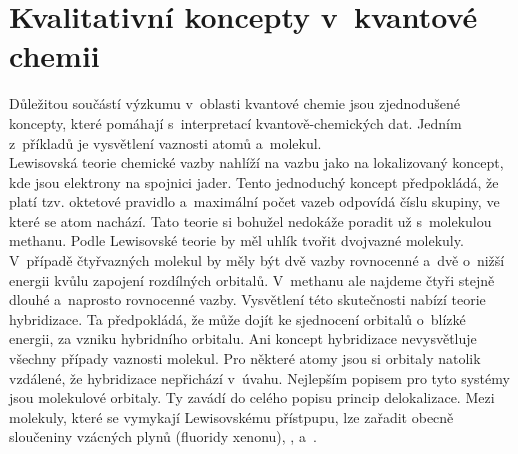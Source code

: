 \documentclass[
  printed, %
  table,   %
  lof,     %
  lot,     %
  oneside,
]{fithesis3}
\begin{document}
\section{Kvalitativní koncepty v~kvantové chemii}
Důležitou součástí výzkumu v~oblasti kvantové chemie jsou zjednodušené koncepty, které pomáhají s~interpretací kvantově-chemických dat. Jedním z~příkladů je vysvětlení vaznosti atomů a~molekul. \\
Lewisovská teorie chemické vazby nahlíží na vazbu jako na lokalizovaný koncept, kde jsou elektrony na spojnici jader. Tento jednoduchý koncept předpokládá, že platí tzv. oktetové pravidlo a~maximální počet vazeb odpovídá číslu skupiny, ve které se atom nachází. Tato teorie si bohužel nedokáže poradit už s~molekulou methanu. Podle Lewisovské teorie by měl uhlík tvořit dvojvazné molekuly. V~případě čtyřvazných molekul by měly být dvě vazby rovnocenné a~dvě o~nižší energii kvůlu zapojení rozdílných orbitalů. V~methanu ale najdeme čtyři stejně dlouhé a~naprosto rovnocenné vazby. Vysvětlení této skutečnosti nabízí teorie hybridizace. Ta předpokládá, že může dojít ke sjednocení orbitalů o~blízké energii, za vzniku hybridního orbitalu. Ani koncept hybridizace nevysvětluje všechny případy vaznosti molekul. Pro některé atomy jsou si orbitaly natolik vzdálené, že hybridizace nepřichází v~úvahu. Nejlepším popisem pro tyto systémy jsou molekulové orbitaly. Ty zavádí do celého popisu princip delokalizace. Mezi molekuly, které se vymykají Lewisovskému přístpupu, lze zařadit obecně sloučeniny vzácných plynů (fluoridy xenonu),  ,  a~. \\
\end{document}
